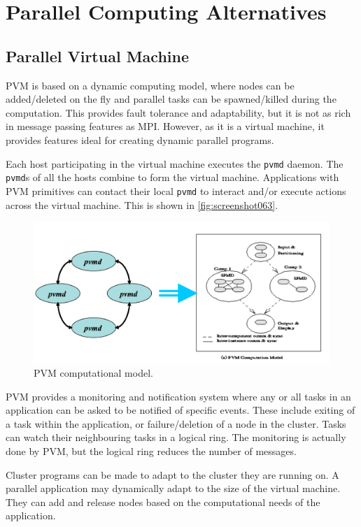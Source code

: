 \chapter{Parallel Computing Alternatives}
\section{Parallel Virtual Machine}
PVM is based on a dynamic computing model, where nodes can be added/deleted on the fly and parallel tasks can be spawned/killed during the computation. This provides fault tolerance and adaptability, but it is not as rich in message passing features as MPI. However, as it is a virtual machine, it provides features ideal for creating dynamic parallel programs.

Each host participating in the virtual machine executes the \texttt{pvmd} daemon. The \texttt{pvmd}s of all the hosts combine to form the virtual machine. Applications with PVM primitives can contact their local \texttt{pvmd} to interact and/or execute actions across the virtual machine. This is shown in \autoref{fig:screenshot063}.

\begin{figure}
\centering
\includegraphics[width=0.7\linewidth]{screenshot063}
\caption{PVM computational model.}
\label{fig:screenshot063}
\end{figure}

PVM provides a monitoring and notification system where any or all tasks in an application can be asked to be notified of specific events. These include exiting of a task within the application, or failure/deletion of a node in the cluster. Tasks can watch their neighbouring tasks in a logical ring. The monitoring is actually done by PVM, but the logical ring reduces the number of messages.

Cluster programs can be made to adapt to the cluster they are running on. A parallel application may dynamically adapt to the size of the virtual machine. They can add and release nodes based on the computational needs of the application.

